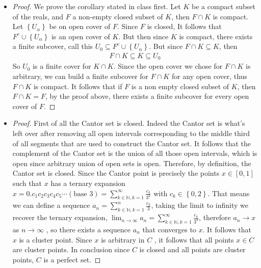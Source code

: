\documentclass[12pt]{article}
\newcommand{\NN}{\mathbb{N}}
\newcommand\set[1]{\left\lbrace #1 \right\rbrace}
\begin{document}
\begin{itemize}
\begin{proof}
        \end{proof}
        \item[4.]
        \begin{proof}
        	We prove the corollary stated in class first. Let $K$ be a compact subset of the reals, and $F$ a non-empty closed subset of $K$, then $F \cap K$ is compact. Let $\set{U_\alpha}$ be on open cover of $F$. Since $F$ is closed, It follows that $F^c \cup \set{U_\alpha}$ is an open cover of $K$. But then since $K$ is compact, there exists a finite subcover, call this $U_0 \subseteq F^c \cup \set{U_\alpha}$. But since $F \cap K \subseteq K$, then 
         \begin{align*}
             F \cap K \subseteq K \subseteq U_0
         \end{align*}
         So $U_0$ is a finite cover for $K \cap K$. Since the open cover we chose for $F\cap K$ is arbitrary, we can build a finite subcover for $F \cap K$ for any open cover, thus $F \cap K$ is compact. It follows that if $F$ is a non empty closed subset of $K$, then $F \cap K = F$, by the proof above, there exists a finite subcover for every open cover of $F$. 
        \end{proof}
        \item[5.] 
        \begin{proof}
        First of all the Cantor set is closed. Indeed the Cantor set is what's left over after removing all open intervals corresponding to the middle third of all segments that are used to construct the Cantor set. It follows that the complement of the Cantor set is the union of all those open intervals, which is open since arbitrary union of open sets is open. Therefore, by definition, the Cantor set is closed. Since the Cantor point is precisely the points $x \in [0,1]$ such that $x$ has a ternary expansion $x = 0.c_1c_2c_3c_4c_5 \cdots (\text{base 3}) = \sum_{k \in \NN, k = 1}^{\infty} \frac{c_k}{3^k}$ with $c_k \in \set{0,2}$. That means we can define a sequence $ a_n = \sum_{k \in \NN, k = 1}^{n} \frac{c_k}{3}$, taking the limit to infinity we recover the ternary expansion, $\lim_{n \to \infty} a_n = \sum_{k \in \NN, k = 1}^{\infty} \frac{c_k}{3^k}$, therefore $a_n \to x$ as $n \to \infty$ , so there exists a sequence $a_n$ that converges to $x$. It follows that $x$ is a cluster point. Since $x$ is arbitrary in $C$ , it follows that all points $x \in C$ are cluster points. In conclusion since $C$ is closed and all points are cluster points, $C$ is a perfect set. 
        \end{proof}

\end{itemize}
\end{document}
